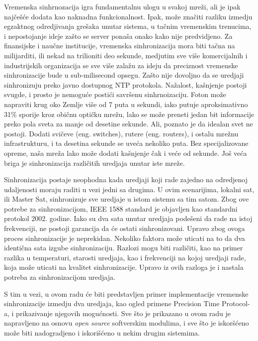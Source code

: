 \documentclass[a4paper,12pt, master]{etf}
\begin{document}
    Vremenska sinhrnozacija igra fundamentalnu ulogu u svakoj mre\v{z}i, ali je
	ipak naj\v{c}e\v{s}\'{c}e dodata kao naknadna funkcionalnost. Ipak,
	mo\v{z}e zna\v{c}iti razliku izmedju egzaktnog odredjivanja gre\v{s}aka
	unutar sistema, u ta\v{c}nim vremenskim trenucima, i nepostojanje ideje
	za\v{s}to se server pona\v{s}a onako kako nije predvidjeno. Za finansijske
	i nau\v{c}ne institucije, vremenska sinhronizacija mora biti ta\v{c}na na
	milijarditi, ili nekad na trilioniti deo sekunde, medjutim sve vi\v{s}e
	komercijalnih i industrijskih organizacija se sve vi\v{s}e zala\v{z}u za
	ideju da preciznost vremenske sinhronizacije bude u sub-milisecond opsegu.
	Za\v{s}to nije dovoljno da se uredjaji sinhronizuju preko javno dostupnog
	NTP protokola. Na\v{z}alost, ka\v{s}njenje postoji svugde, i prosto je
	nemogu\'{c}e posti\'{c}i savr\v{s}enu sinhrnoizaciju. Foton mo\v{z}e
    napraviti krug oko Zemlje vi\v{s}e od 7 puta u sekundi, iako putuje
    aproksimativno 31\% sporije kroz obi\v{c}nu opti\v{c}ku mre\v{z}u, lako se
    mo\v{z}e preneti jedan bit informacije preko pola sveta za manje od desetine
    sekunde. Ali, poznato je da idealan svet ne postoji. Dodati svi\v{c}eve
    (eng\@. switches), rutere (eng\@. routers), i ostalu mre\v{z}nu
    infrastrukturu, i ta desetina sekunde se uve\'{c}a nekoliko puta. Bez
    specijalizovane opreme, na\v{s}a mre\v{z}a lako mo\v{z}e dodati
    ka\v{s}njenje \v{c}ak i ve\'{c}e od sekunde. Jo\v{s} ve\'{c}a briga je
    sinhronizacija razli\v{c}itih uredjaja unutar iste mre\v{z}e.

	Sinhronizacija postaje neophodna kada uredjaji koji rade zajedno na
	odredjenoj udaljenosti moraju raditi u vezi jedni sa drugima. U ovim
	scenarijima, lokalni sat, ili Master Sat, sinhronizuje sve uredjaje u istom
	sistemu sa tim satom. Zbog ove potrebe za sinhronizacijom, IEEE 1588
	standard je objavljen kao standardni protokol 2002. godine. Iako su dva
	sata unutar uredjaja pode\v{s}eni da rade na istoj frekvenciji, ne postoji
	garancija da \'{c}e ostati sinhronizovani. Upravo zbog ovoga proces
	sinhronizacije je neprekidan. Nekoliko faktora mo\v{z}e uticati na to da
	dva identi\v{c}na sata izgube sinhronizaciju. Razlozi mogu biti
	razli\v{c}iti, kao na primer razlika u temperaturi, starosti uredjaja, kao
	i frekvenciji na kojoj uredjaji rade, koja mo\v{z}e uticati na kvalitet
	sinhronizacije. Upravo iz ovih razloga je i	nastala potreba za
	sinhronizacijom uredjaja.

	S tim u vezi, u ovom radu \'{c}e biti predstavljen primer implementacije
	vremenske sinhronizacije izmedju dva uredjaja, kao ogled primene Precision
	Time Protocol-a, i prikazivanje njegovih mogu\'{c}nosti. Sve \v{s}to je
	prikazano u ovom radu je napravljeno na osnovu \textit{open source}
	softverskim modulima, i sve \v{s}to je iskor\v{s}\'{c}eno mo\v{z}e biti
	nadogradjeno i iskori\v{s}\'{c}eno u nekim drugim sistemima.
\end{document}
